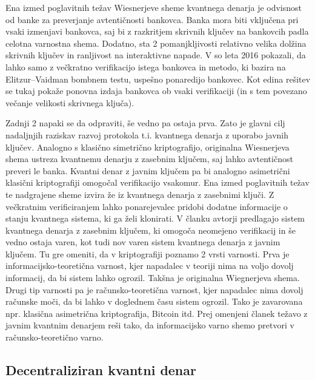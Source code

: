 \documentclass[12pt]{article}
\begin{document}
Ena izmed poglavitnih težav Wiesnerjeve sheme kvantnega denarja je odvisnost od banke za preverjanje avtentičnosti bankovca. Banka mora biti vključena pri vsaki izmenjavi bankovca, saj bi z razkritjem skrivnih ključev na bankovcih padla celotna varnostna shema. Dodatno, sta 2 pomanjkljivosti relativno velika dolžina skrivnih ključev in ranljivost na interaktivne napade. V \cite{brodutchAdaptiveAttackWiesner2016} so leta 2016 pokazali, da lahko samo z večkratno verifikacijo istega bankovca in metodo, ki bazira na Elitzur–Vaidman bombnem testu, uspešno ponaredijo bankovec. Kot edina rešitev se tukaj pokaže ponovna izdaja bankovca ob vsaki verifikaciji (in s tem povezano večanje velikosti skrivnega ključa).
\par Zadnji 2 napaki se da odpraviti, še vedno pa ostaja prva. Zato je glavni cilj nadaljnjih raziskav razvoj protokola t.i. kvantnega denarja z uporabo javnih ključev. Analogno s klasično simetrično kriptografijo, originalna Wiesnerjeva shema ustreza kvantnemu denarju z zasebnim ključem, saj lahko avtentičnost preveri le banka. Kvantni denar z javnim ključem pa bi analogno asimetrični klasični kriptografiji omogočal verifikacijo vsakomur. Ena izmed poglavitnih težav te nadgrajene sheme izvira že iz kvantnega denarja z zasebnimi ključi. Z večkratnim verificiranjem lahko ponarejevalec pridobi dodatne informacije o stanju kvantnega sistema, ki ga želi klonirati. V članku \cite{aaronsonQuantumMoneyHidden2012} avtorji predlagajo sistem kvantnega denarja z zasebnim ključem, ki omogoča neomejeno verifikacij in še vedno ostaja varen, kot tudi nov varen sistem kvantnega denarja z javnim ključem. Tu gre omeniti, da v kriptografiji poznamo 2 vrsti varnosti. Prva je informacijsko-teoretična varnost, kjer napadalec v teoriji nima na voljo dovolj informacij, da bi sistem lahko ogrozil. Takšna je originalna Wiegnerjeva shema. Drugi tip varnosti pa je računsko-teoretična varnost, kjer napadalec nima dovolj računske moči, da bi lahko v doglednem času sistem ogrozil. Tako je zavarovana npr. klasična asimetrična kriptografija, Bitcoin itd. Prej omenjeni članek \cite{aaronsonQuantumMoneyHidden2012} težavo z javnim kvantnim denarjem reši tako, da informacijsko varno shemo pretvori v računsko-teoretično varno. 

\pagebreak

\subsection{Decentraliziran kvantni denar}
\end{document}

